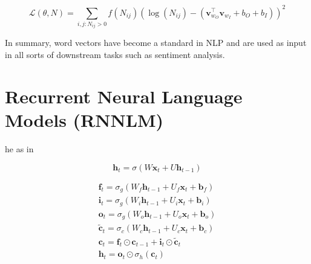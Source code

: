 \begin{equation} \label{eq:glove}
	\mathcal{L}(\theta, N) = \sum_{i,j:N_{ij}>0}f(N_{ij})(\log(N_{ij})-(\mathbf{v}_{w_O}^{\top} \mathbf{v}_{w_I} + b_O + b_I))^2
\end{equation}

In summary, word vectors have become a standard in NLP and are used as input in all sorts of downstream tasks such as sentiment analysis.

\section{Recurrent Neural Language Models (RNNLM)}
\label{sec:lstm}

he \cite{hochreiter1997long} as in 

\noindent\begin{minipage}{.4\linewidth}
	\begin{equation} \label{eq:rnncell}
		\mathbf h_t = \sigma(W \mathbf x_t + U \mathbf h_{t-1})
	\end{equation}
\end{minipage}
\hspace{1cm}
\begin{minipage}{.5\linewidth}
	\begin{equation} \label{eq:lstmcell}
		\begin{gathered}
			\mathbf{f}_t = \sigma_g(W_f \mathbf{h}_{t-1} + U_f\mathbf{x}_t + \mathbf{b}_f) \\
			\mathbf{i}_t = \sigma_g(W_i \mathbf{h}_{t-1} + U_i \mathbf{x}_t + \mathbf{b}_i) \\
			\mathbf{o}_t = \sigma_g(W_o \mathbf{h}_{t-1} + U_o \mathbf{x}_t + \mathbf{b}_o) \\
			\mathbf{\tilde{c}}_t = \sigma_c(W_c \mathbf{h}_{t-1} + U_c \mathbf{x}_t + \mathbf{b}_c) \\
			\mathbf{c}_t = \mathbf{f}_{t} \odot \mathbf{c}_{t-1} + \mathbf{i}_{t} \odot \mathbf{\tilde{c}}_t \\
			\mathbf{h}_t = \mathbf{o}_{t} \odot \sigma_h(\mathbf{c}_{t})\\
		\end{gathered}
	\end{equation}
\end{minipage}
